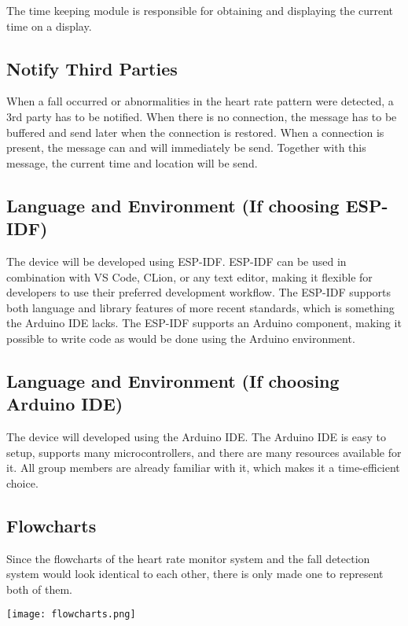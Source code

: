 \documentclass{article}
\begin{document}
The time keeping module is responsible for obtaining and displaying the current time on a display.

\subsection{Notify Third Parties}

When a fall occurred or abnormalities in the heart rate pattern were detected, a 3rd party has to be notified.
When there is no connection, the message has to be buffered and send later when the connection is restored.
When a connection is present, the message can and will immediately be send.
Together with this message, the current time and location will be send.

\subsection*{Language and Environment (If choosing ESP-IDF)}

The device will be developed using ESP-IDF.
ESP-IDF can be used in combination with VS Code, CLion, or any text editor, making it flexible for developers to use their preferred development workflow.
The ESP-IDF supports both language and library features of more recent \cpp{} standards, which is something the Arduino IDE lacks.
The ESP-IDF supports an Arduino component, making it possible to write code as would be done using the Arduino environment.

\subsection*{Language and Environment (If choosing Arduino IDE)}

The device will developed using the Arduino IDE.
The Arduino IDE is easy to setup, supports many microcontrollers, and there are many resources available for it.
All group members are already familiar with it, which makes it a time-efficient choice.

\subsection{Flowcharts}

Since the flowcharts of the heart rate monitor system and the fall detection system would look identical to each other, there is only made one to represent both of them.

\texttt{[image: flowcharts.png]}
\end{document}
